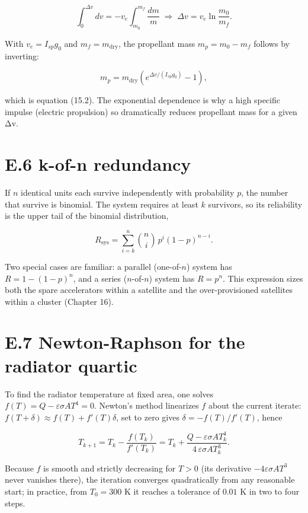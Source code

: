 \documentclass[
  11pt,
  openany,
  oneside]{book}
\begin{document}
\[\int_0^{\Delta v} dv = -v_e \int_{m_0}^{m_f} \frac{dm}{m} \;\Longrightarrow\; \Delta v = v_e \ln\frac{m_0}{m_f}.\]

With \(v_e = I_{sp} g_0\) and \(m_f = m_{\mathrm{dry}}\), the propellant
mass \(m_p = m_0 - m_f\) follows by inverting:

\[m_p = m_{\mathrm{dry}}\left(e^{\Delta v/(I_{sp} g_0)} - 1\right),\]

which is equation (15.2). The exponential dependence is why a high
specific impulse (electric propulsion) so dramatically reduces
propellant mass for a given Δv.

\section{E.6 k-of-n redundancy}\label{e.6-k-of-n-redundancy}

If \(n\) identical units each survive independently with probability
\(p\), the number that survive is binomial. The system requires at least
\(k\) survivors, so its reliability is the upper tail of the binomial
distribution,

\[R_{\mathrm{sys}} = \sum_{i=k}^{n} \binom{n}{i}\, p^i (1-p)^{n-i}.\]

Two special cases are familiar: a parallel (one-of-\(n\)) system has
\(R = 1 - (1-p)^n\), and a series (\(n\)-of-\(n\)) system has
\(R = p^n\). This expression sizes both the spare accelerators within a
satellite and the over-provisioned satellites within a cluster (Chapter
16).

\section{E.7 Newton-Raphson for the radiator
quartic}\label{e.7-newton-raphson-for-the-radiator-quartic}

To find the radiator temperature at fixed area, one solves
\(f(T) = Q - \varepsilon\sigma A T^4 = 0\). Newton's method linearizes
\(f\) about the current iterate:
\(f(T + \delta) \approx f(T) + f'(T)\delta\), set to zero gives
\(\delta = -f(T)/f'(T)\), hence

\[T_{k+1} = T_k - \frac{f(T_k)}{f'(T_k)} = T_k + \frac{Q - \varepsilon\sigma A T_k^4}{4\,\varepsilon\sigma A T_k^3}.\]

Because \(f\) is smooth and strictly decreasing for \(T>0\) (its
derivative \(-4\varepsilon\sigma A T^3\) never vanishes there), the
iteration converges quadratically from any reasonable start; in
practice, from \(T_0 = 300\) K it reaches a tolerance of \(0.01\) K in
two to four steps.
\end{document}

